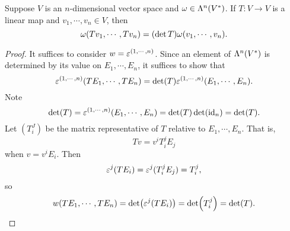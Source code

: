 \begin{proposition}\label{14.9}
    Suppose $V$ is an $n$-dimensional vector space and $\omega \in \Lambda^n(V^*)$. If $T:V \to V$ is a linear map and $v_1,\cdots,v_n \in V$, then 
    $$\omega(Tv_1,\cdots,Tv_n) = (\det T)\omega(v_1,\cdots,v_n). $$
\end{proposition}
\begin{proof}
    It suffices to consider $w = \varepsilon^{(1,\cdots,n)}$. Since an element of $\Lambda^n(V^*)$ is determined by its value on $E_1,\cdots, E_n$, it suffices to show that $$\varepsilon^{(1,\cdots,n)}(TE_1,\cdots,TE_n) = \det(T)\varepsilon^{(1,\cdots,n)}(E_1,\cdots,E_n).$$
    Note 
    $$\det(T) = \varepsilon^{(1,\cdots,n)}(E_1,\cdots,E_n) = \det(T)\det(\mathrm{id}_n) = \det(T).$$
    Let $(T_i^J)$ be the matrix representative of $T$ relative to $E_1,\cdots,E_n$. That is, 
    $$Tv = v^iT_i^jE_j$$ when $v = v^iE_i$. 
    Then $$\varepsilon^j(TE_i) = \varepsilon^j(T_i^jE_j)
    = T_i^j, $$ so 
    $$w(TE_1,\cdots,TE_n) = \det(\varepsilon^j(TE_i)) = \det(T_i^j) = \det (T). $$
\end{proof}

